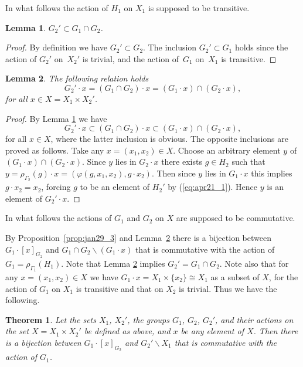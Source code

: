 \documentclass[11pt]{article}
\newtheorem{theorem}{Theorem}
\newtheorem{lemma}{Lemma}
\begin{document}
In what follows the action of $H_1$ on $X_1$ is supposed to be transitive.
\begin{lemma}\label{lem:feb9_1}
$G_2' \subset G_1 \cap G_2$.
\end{lemma}

\begin{proof}
By def\/inition we have $G_2' \subset G_2$.
The inclusion $G_2' \subset G_1$ holds since the action of $G_2'$
on~$X_2'$ is trivial, and the action of~$G_1$ on~$X_1$ is transitive.
\end{proof}

\begin{lemma}\label{lem:feb9_2}
The following relation holds
\begin{displaymath}
G_2' \cdot x = (G_1 \cap G_2) \cdot x =
(G_1 \cdot x) \cap (G_2 \cdot x),
\end{displaymath}
for all $x \in X= X_1 \times X_2'$.
\end{lemma}
\begin{proof}
By Lemma \ref{lem:feb9_1} we have
\begin{displaymath}
G_2' \cdot x \subset (G_1 \cap G_2) \cdot x \subset
(G_1 \cdot x) \cap (G_2 \cdot x),
\end{displaymath}
for all $x \in X$,
where the latter inclusion is obvious.
The opposite inclusions are proved as follows.
Take any $x = (x_1, x_2) \in X$.
Choose an arbitrary element $y$ of $(G_1 \cdot x) \cap (G_2 \cdot x)$.
Since $y$ lies in $G_2 \cdot x$ there exists $g \in H_2$ such that
$y = \rho_{\varGamma_2} (g) \cdot x = (\varphi (g, x_1,x_2), g \cdot x_2)$.
Then since $y$ lies in $G_1 \cdot x$ this implies $g \cdot x_2 = x_2$, forcing
$g$ to be an element of $H_2'$ by (\ref{eq:apr21_1}).
Hence $y$ is an element of $G_2' \cdot x$.
\end{proof}

In what follows the actions of $G_1$ and $G_2$ on $X$ are supposed to be commutative.

By Proposition~\ref{prop:jan29_3} and Lemma~\ref{lem:feb9_2}
there is a bijection between $G_1 \cdot [x]_{G_2}$ and $G_1 \cap G_2 \backslash (G_1 \cdot x)$
that is commutative with the action of $G_1= \rho_{\varGamma_1} (H_1)$.
Note that Lemma \ref{lem:feb9_2} implies $G_2' = G_1 \cap G_2$.
Note also that for any $x =(x_1,x_2) \in X$ we have
$G_1 \cdot x = X_1 \times \{ x_2 \} \cong X_1$ as a subset of $X$, for
the action of $G_1$ on $X_1$ is transitive and that on $X_2$ is trivial.
Thus we have the following.

\begin{theorem}\label{th:apr10_1}
Let the sets $X_1$, $X_2'$,
the groups $G_1$, $G_2$, $G_2'$, and their actions on the set $X= X_1 \times X_2'$ be defined as above, and $x$ be any element of $X$.
Then there is a bijection between $G_1 \cdot [x]_{G_2}$ and $G_2' \backslash X_1$ that is commutative with the action of $G_1$.
\end{theorem}
\end{document}
